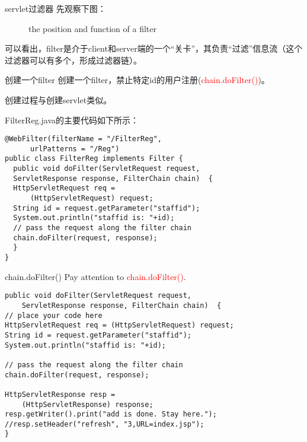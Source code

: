 \documentclass{beamer}
\begin{document}
\begin{frame}{servlet过滤器}
先观察下图：
\begin{figure}
\caption{the position and function of a filter}
\end{figure}
可以看出，filter是介于client和server端的一个“关卡”，其负责“过滤”信息流（这个过滤器可以有多个，形成过滤器链）。
\end{frame}
\begin{frame}[fragile]{创建一个filter}
创建一个filter，禁止特定id的用户注册(\textcolor{red}{chain.doFilter()})。

创建过程与创建servlet类似。

FilterReg.java的主要代码如下所示：
\begin{lstlisting}
@WebFilter(filterName = "/FilterReg",
      urlPatterns = "/Reg")
public class FilterReg implements Filter {
  public void doFilter(ServletRequest request, 
  ServletResponse response, FilterChain chain)  {
  HttpServletRequest req = 
      (HttpServletRequest) request; 
  String id = request.getParameter("staffid");
  System.out.println("staffid is: "+id);
  // pass the request along the filter chain
  chain.doFilter(request, response);
  }
}
\end{lstlisting}
\end{frame}
\begin{frame}[fragile]{chain.doFilter()}
Pay attention to 
\textcolor{red}{chain.doFilter()}.
\begin{lstlisting}
public void doFilter(ServletRequest request, 
    ServletResponse response, FilterChain chain)  {
// place your code here
HttpServletRequest req = (HttpServletRequest) request; 
String id = request.getParameter("staffid");
System.out.println("staffid is: "+id);
	
// pass the request along the filter chain
chain.doFilter(request, response);
		
HttpServletResponse resp = 
    (HttpServletResponse) response;
resp.getWriter().print("add is done. Stay here.");
//resp.setHeader("refresh", "3,URL=index.jsp");
}
\end{lstlisting}
\end{frame}
\end{document}
